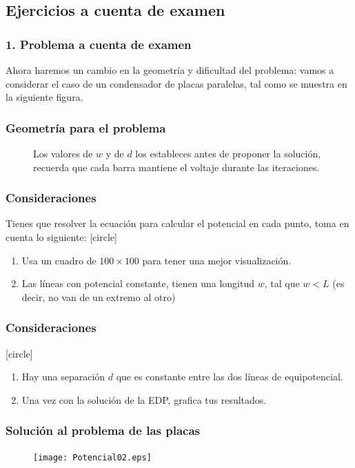 \subsection{Ejercicios a cuenta de examen}
\begin{frame}
\frametitle{1. Problema a cuenta de examen}
Ahora haremos un cambio en la geometría y dificultad del problema: vamos a considerar el caso de un condensador de placas paralelas, tal como se muestra en  la siguiente figura.
\end{frame}
\begin{frame}
\frametitle{Geometría para el problema}
\begin{figure}
	\centering
	
	\caption{Los valores de $w$ y de $d$ los estableces antes de proponer la solución, recuerda que cada barra mantiene el voltaje durante las iteraciones.}
\end{figure}
\end{frame}
\begin{frame}
\frametitle{Consideraciones}
Tienes que resolver la ecuación para calcular el potencial en cada punto, toma en cuenta lo siguiente:
[circle]
\begin{enumerate}[<+->]
\item Usa un cuadro de $100 \times 100$ para tener una mejor visualización.
\item Las líneas con potencial constante, tienen una longitud $w$, tal que $w<L$  (es decir, no van de un extremo al otro)
\seti
\end{enumerate}
\end{frame}
\begin{frame}
\frametitle{Consideraciones}
[circle]
\begin{enumerate}[<+->]
\conti
\item Hay una separación $d$ que es constante entre las dos líneas de equipotencial.
\item Una vez con la solución de la EDP, grafica tus resultados.
\end{enumerate}
\end{frame}
{
\begin{frame}[fragile]
\frametitle{Solución al problema de las placas}
\begin{figure}
	\centering
	\texttt{[image: Potencial02.eps]} 
\end{figure}
\end{frame}
}
